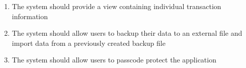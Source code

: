 \begin{adjustwidth}{1.5em}{0pt}
\begin{enumerate}[label=3.\arabic*]
		\item The system should provide a view containing individual transaction information
		
		\item The system should allow users to backup their data to an external file and import data from a previously created backup file
		
		\item The system should allow users to passcode protect the application
		
\end{enumerate}


	
\end{adjustwidth}
